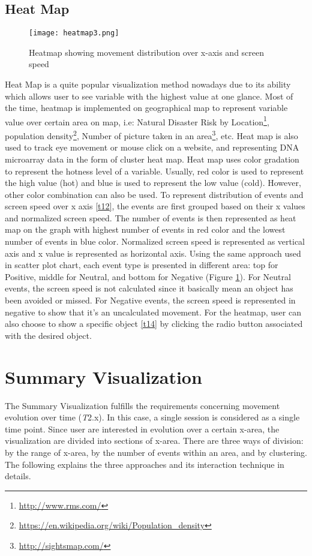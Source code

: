 \subsection{Heat Map}
\begin{figure}
\centering
\texttt{[image: heatmap3.png]}
\caption{Heatmap showing movement distribution over x-axis and screen speed}
\label{heatmap}
\end{figure}
Heat Map is a quite popular visualization method nowadays due to its ability which allows user to see variable with the highest value at one glance. Most of the time, heatmap is implemented on geographical map to represent variable value over certain area on map, i.e: Natural Disaster Risk by Location\footnote{\url{http://www.rms.com/}}, population density\footnote{\url{https://en.wikipedia.org/wiki/Population_density}}, Number of picture taken in an area\footnote{\url{http://sightsmap.com/}}, etc. Heat map is also used to track eye movement or mouse click on a website, and representing DNA microarray data in the form of cluster heat map\cite{friendly}. Heat map uses color gradation to represent the hotness level of a variable. Usually, red color is used to represent the high value (hot) and blue is used to represent the low value (cold). However, other color combination can also be used. To represent distribution of events and screen speed over x axis \ref{t12}, the events are first grouped based on their x values and normalized screen speed. The number of events is then represented as heat map on the graph with highest number of events in red color and the lowest number of events in blue color. Normalized screen speed is represented as vertical axis and x value is represented as horizontal axis. Using the same approach used in scatter plot chart, each event type is presented in different area: top for Positive, middle for Neutral, and bottom for Negative (Figure \ref{heatmap}). For Neutral events, the screen speed is not calculated since it basically mean an object has been avoided or missed. For Negative events, the screen speed is represented in negative to show that it's an uncalculated movement. For the heatmap, user can also choose to show a specific object \ref{t14} by clicking the radio button associated with the desired object.

\section{Summary Visualization}
The Summary Visualization fulfills the requirements concerning movement evolution over time (\textit{T}2.x). In this case, a single session is considered as a single time point. Since user are interested in evolution over a certain x-area, the visualization are divided into sections of x-area. There are three ways of division: by the range of x-area, by the number of events within an area, and by clustering. The following explains the three approaches and its interaction technique in details.

